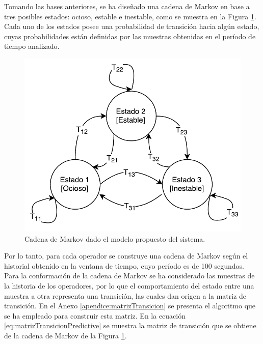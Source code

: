 Tomando las bases anteriores, se ha diseñado una cadena de Markov en base a tres posibles estados: ocioso, estable e inestable, como se muestra en la Figura \ref{fig:cadenaMarkovPredictiva}. Cada uno de los estados posee una probabilidad de transición hacia algún estado, cuyas probabilidades están definidas por las muestras obtenidas en el período de tiempo analizado.

\begin{figure}[ht!]
  \centering
    \includegraphics[scale=0.75]{images/CadenaMarkovPredictiva.pdf}
  \caption{Cadena de Markov dado el modelo propuesto del sistema.}
  \label{fig:cadenaMarkovPredictiva}
\end{figure}


Por lo tanto, para cada operador se construye una cadena de Markov según el historial obtenido en la ventana de tiempo, cuyo período es de 100 segundos. Para la conformación de la cadena de Markov se ha considerado las muestras de la historia de los operadores, por lo que el comportamiento del estado entre una muestra a otra representa una transición, las cuales dan origen a la matriz de transición. En el Anexo \ref{apendice:matrizTransicion} se presenta el algoritmo que se ha empleado para construir esta matriz. En la ecuación \ref{eq:matrizTransicionPredictive} se muestra la matriz de transición que se obtiene de la cadena de Markov de la Figura \ref{fig:cadenaMarkovPredictiva}.

